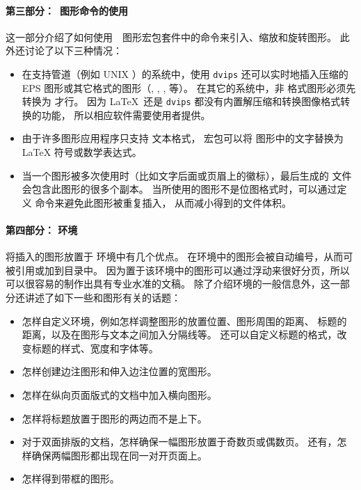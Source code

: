 \paragraph{第三部分：\LaTeXe{}~图形命令的使用}
这一部分介绍了如何使用~\LaTeXe{}~图形宏包套件中的命令来引入、缩放和旋转图形。
此外还讨论了以下三种情况：
\begin{itemize}
	\item 在支持管道（例如 UNIX ）的系统中，使用 \texttt{dvips} 还可以实时地插入压缩的 EPS 图形或其它格式的图形（, , ,  等）。
	在其它的系统中，非  格式图形必须先转换为  才行。
	因为 \LaTeX\ 还是 \texttt{dvips} 都没有内置解压缩和转换图像格式转换的功能，
	所以相应软件需要使用者提供。
	\item 由于许多图形应用程序只支持 \ascii 文本格式，
	 宏包可以将  图形中的文字替换为 \LaTeX{} 符号或数学表达式。
	\item 当一个图形被多次使用时（比如文字后面或页眉上的徽标），最后生成的  文件会包含此图形的很多个副本。
	当所使用的图形不是位图格式时，可以通过定义  命令来避免此图形被重复插入，
	从而减小得到的文件体积。
\end{itemize}

\paragraph{第四部分： 环境}
将插入的图形放置于 环境中有几个优点。
在环境中的图形会被自动编号，从而可被引用或加到目录中。
因为置于该环境中的图形可以通过浮动来很好分页，所以可以很容易的制作出具有专业水准的文稿。
除了介绍环境的一般信息外，这一部分还讲述了如下一些和图形有关的话题：
\begin{itemize}
	\item 怎样自定义环境，例如怎样调整图形的放置位置、图形周围的距离、
	标题的距离，以及在图形与文本之间加入分隔线等。
	还可以自定义标题的格式，改变标题的样式、宽度和字体等。
	\item 怎样创建边注图形和伸入边注位置的宽图形。
	\item 怎样在纵向页面版式的文档中加入横向图形。
	\item 怎样将标题放置于图形的两边而不是上下。
	\item 对于双面排版的文档，怎样确保一幅图形放置于奇数页或偶数页。
	还有，怎样确保两幅图形都出现在同一对开页面上。
	\item 怎样得到带框的图形。
\end{itemize}

